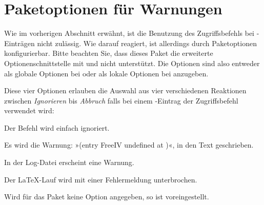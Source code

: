 \section{Paketoptionen für Warnungen}

Wie im vorherigen Abschnitt erwähnt, ist die Benutzung des Zugriffsbefehls
 bei -Einträgen nicht
zulässig. Wie  darauf reagiert, ist allerdings durch
Paketoptionen konfigurierbar. Bitte beachten Sie, dass
dieses Paket die erweiterte Optionenschnittstelle mit
 und  nicht
unterstützt. Die Optionen sind also entweder als globale Optionen bei
 oder als lokale Optionen bei
 anzugeben.


\begin{Declaration}
\end{Declaration}
Diese vier Optionen erlauben die Auswahl aus vier verschiedenen Reaktionen
zwischen \emph{Ignorieren} bis \emph{Abbruch} falls bei einem
-Eintrag der Zugriffsbefehl 
verwendet wird:
%
\begin{labeling}[~--]{}
\item[\Option{adrFreeIVempty}] 
        Der Befehl  wird einfach ignoriert.
\item[\Option{adrFreeIVshow}] 
        Es wird die Warnung: »(entry FreeIV undefined at )«,
           in den Text geschrieben.
\item[\Option{adrFreeIVwarn}]
        In der Log-Datei erscheint eine Warnung.
\item[\Option{adrFreeIVstop}]
        Der \LaTeX{}-Lauf wird mit einer Fehlermeldung unterbrochen.
\end{labeling}
Wird für das Paket keine Option angegeben, so ist 
voreingestellt.%
\EndIndexGroup
%
\EndIndexGroup
\endinput



